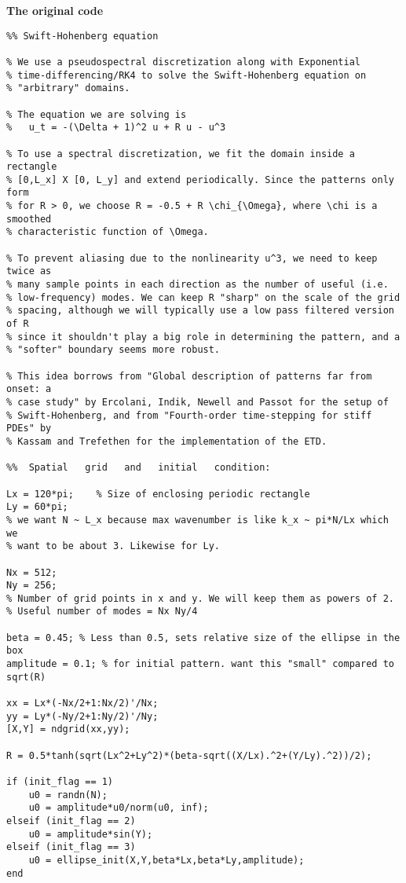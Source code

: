\documentclass[12pt]{article}
\begin{document}
\textbf{The original code}
\begin{verbatim}
%% Swift-Hohenberg equation

% We use a pseudospectral discretization along with Exponential
% time-differencing/RK4 to solve the Swift-Hohenberg equation on
% "arbitrary" domains.

% The equation we are solving is 
%   u_t = -(\Delta + 1)^2 u + R u - u^3

% To use a spectral discretization, we fit the domain inside a rectangle
% [0,L_x] X [0, L_y] and extend periodically. Since the patterns only form
% for R > 0, we choose R = -0.5 + R \chi_{\Omega}, where \chi is a smoothed
% characteristic function of \Omega. 

% To prevent aliasing due to the nonlinearity u^3, we need to keep twice as
% many sample points in each direction as the number of useful (i.e.
% low-frequency) modes. We can keep R "sharp" on the scale of the grid
% spacing, although we will typically use a low pass filtered version of R
% since it shouldn't play a big role in determining the pattern, and a
% "softer" boundary seems more robust.

% This idea borrows from "Global description of patterns far from onset: a
% case study" by Ercolani, Indik, Newell and Passot for the setup of
% Swift-Hohenberg, and from "Fourth-order time-stepping for stiff PDEs" by
% Kassam and Trefethen for the implementation of the ETD.

%%  Spatial   grid   and   initial   condition:

Lx = 120*pi;    % Size of enclosing periodic rectangle
Ly = 60*pi;
% we want N ~ L_x because max wavenumber is like k_x ~ pi*N/Lx which we
% want to be about 3. Likewise for Ly.

Nx = 512;    
Ny = 256;
% Number of grid points in x and y. We will keep them as powers of 2.
% Useful number of modes = Nx Ny/4 

beta = 0.45; % Less than 0.5, sets relative size of the ellipse in the box
amplitude = 0.1; % for initial pattern. want this "small" compared to sqrt(R)

xx = Lx*(-Nx/2+1:Nx/2)'/Nx;
yy = Ly*(-Ny/2+1:Ny/2)'/Ny;
[X,Y] = ndgrid(xx,yy);

R = 0.5*tanh(sqrt(Lx^2+Ly^2)*(beta-sqrt((X/Lx).^2+(Y/Ly).^2))/2);

if (init_flag == 1)
    u0 = randn(N);
    u0 = amplitude*u0/norm(u0, inf);
elseif (init_flag == 2)
    u0 = amplitude*sin(Y);
elseif (init_flag == 3)    
    u0 = ellipse_init(X,Y,beta*Lx,beta*Ly,amplitude);
end


\end{verbatim}
\end{document}
